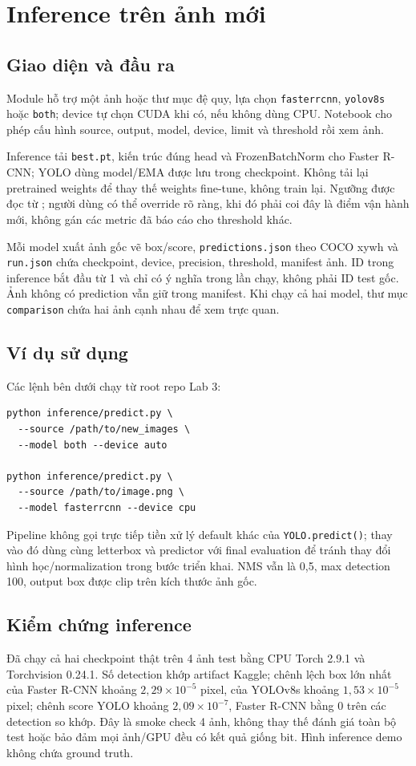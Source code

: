 \documentclass[a4paper,10pt,twocolumn]{article}
\newcommand{\FR}{Faster R-CNN}
\newcommand{\YO}{YOLOv8s}
\begin{document}
\section{Inference trên ảnh mới}
\subsection{Giao diện và đầu ra}
Module  hỗ trợ một ảnh hoặc thư mục đệ quy, lựa chọn
\texttt{fasterrcnn}, \texttt{yolov8s} hoặc \texttt{both}; device tự chọn CUDA khi có,
nếu không dùng CPU. Notebook  cho phép cấu hình
source, output, model, device, limit và threshold rồi xem ảnh.

Inference tải \texttt{best.pt}, kiến trúc đúng head và FrozenBatchNorm cho \FR{};
YOLO dùng model/EMA được lưu trong checkpoint. Không tải lại pretrained weights
để thay thế weights fine-tune, không train lại. Ngưỡng được đọc từ
; người dùng có thể override rõ ràng, khi đó phải
coi đây là điểm vận hành mới, không gán các metric đã báo cáo cho threshold khác.

Mỗi model xuất ảnh gốc vẽ box/score, \texttt{predictions.json} theo COCO xywh và
\texttt{run.json} chứa checkpoint, device, precision, threshold, manifest ảnh.
ID trong inference bắt đầu từ 1 và chỉ có ý nghĩa trong lần chạy, không phải ID test
gốc. Ảnh không có prediction vẫn giữ trong manifest. Khi chạy cả hai model, thư mục
\texttt{comparison} chứa hai ảnh cạnh nhau để xem trực quan.

\subsection{Ví dụ sử dụng}
Các lệnh bên dưới chạy từ root repo Lab 3:
\begin{lstlisting}
python inference/predict.py \
  --source /path/to/new_images \
  --model both --device auto

python inference/predict.py \
  --source /path/to/image.png \
  --model fasterrcnn --device cpu
\end{lstlisting}
Pipeline không gọi trực tiếp tiền xử lý default khác của \texttt{YOLO.predict()};
thay vào đó dùng cùng letterbox và predictor với final evaluation để tránh thay đổi
hình học/normalization trong bước triển khai. NMS vẫn là 0,5, max detection 100,
output box được clip trên kích thước ảnh gốc.

\subsection{Kiểm chứng inference}
Đã chạy cả hai checkpoint thật trên 4 ảnh test bằng CPU Torch 2.9.1 và
Torchvision 0.24.1. Số detection khớp artifact Kaggle; chênh lệch box lớn nhất của
\FR{} khoảng $2,29\times10^{-5}$ pixel, của \YO{} khoảng $1,53\times10^{-5}$ pixel;
chênh score YOLO khoảng $2,09\times10^{-7}$, \FR{} bằng 0 trên các detection so khớp.
Đây là smoke check 4 ảnh, không thay thế đánh giá toàn bộ test hoặc bảo đảm mọi
ảnh/GPU đều có kết quả giống bit. Hình inference demo không chứa ground truth.
\end{document}
